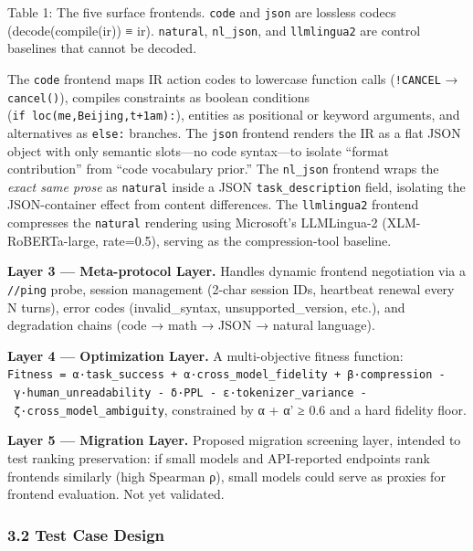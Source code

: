 Table 1: The five surface frontends. \texttt{code} and \texttt{json} are lossless codecs (decode(compile(ir)) ≡ ir). \texttt{natural}, \texttt{nl\_json}, and \texttt{llmlingua2} are control baselines that cannot be decoded.



The \texttt{code} frontend maps IR action codes to lowercase function calls (\texttt{!CANCEL} → \texttt{cancel()}), compiles constraints as boolean conditions (\texttt{if\ loc(me,Beijing,t+1am):}), entities as positional or keyword arguments, and alternatives as \texttt{else:} branches. The \texttt{json} frontend renders the IR as a flat JSON object with only semantic slots---no code syntax---to isolate ``format contribution'' from ``code vocabulary prior.'' The \texttt{nl\_json} frontend wraps the \emph{exact same prose} as \texttt{natural} inside a JSON \texttt{task\_description} field, isolating the JSON-container effect from content differences. The \texttt{llmlingua2} frontend compresses the \texttt{natural} rendering using Microsoft's LLMLingua-2 (XLM-RoBERTa-large, rate=0.5), serving as the compression-tool baseline.



\textbf{Layer 3 --- Meta-protocol Layer.} Handles dynamic frontend negotiation via a \texttt{//ping} probe, session management (2-char session IDs, heartbeat renewal every N turns), error codes (invalid\_syntax, unsupported\_version, etc.), and degradation chains (code → math → JSON → natural language).



\textbf{Layer 4 --- Optimization Layer.} A multi-objective fitness function: \texttt{Fitness\ =\ α·task\_success\ +\ α\textquotesingle{}·cross\_model\_fidelity\ +\ β·compression\ -\ γ·human\_unreadability\ -\ δ·PPL\ -\ ε·tokenizer\_variance\ -\ ζ·cross\_model\_ambiguity}, constrained by α + α' ≥ 0.6 and a hard fidelity floor.



\textbf{Layer 5 --- Migration Layer.} Proposed migration screening layer, intended to test ranking preservation: if small models and API-reported endpoints rank frontends similarly (high Spearman ρ), small models could serve as proxies for frontend evaluation. Not yet validated.



\subsubsection{3.2 Test Case Design}\label{test-case-design}



